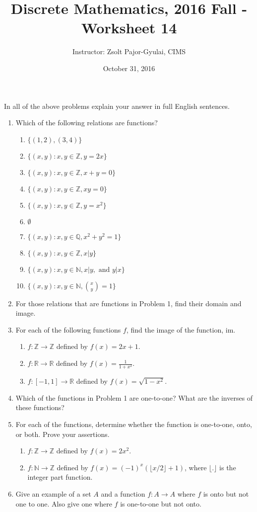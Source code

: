 \documentclass[11pt]{preprint}
\title{Discrete Mathematics, 2016 Fall - Worksheet 14}
\author{Instructor: Zsolt Pajor-Gyulai, CIMS}
\date{October 31, 2016}
\def\enumb{\begin{enumerate}}
\def\enume{\end{enumerate}}
\begin{document}
\maketitle

In all of the above problems explain your answer in full English sentences.

\enumb
\item Which of the following relations are functions?
\enumb
\item $\{(1,2),(3,4)\}$
\item $\{(x,y): x,y\in\mathbb{Z}, y=2x\}$
\item $\{(x,y): x,y\in\mathbb{Z}, x+y=0\}$
\item $\{(x,y): x,y\in\mathbb{Z}, xy=0\}$
\item $\{(x,y): x,y\in\mathbb{Z}, y=x^2\}$
\item $\emptyset$
\item $\{(x,y): x,y\in\mathbb{Q}, x^2+y^2=1\}$
\item $\{(x,y): x,y\in\mathbb{Z}, x|y\}$
\item $\{(x,y): x,y\in\mathbb{N}, x|y,\textrm{ and }y|x\}$
\item $\{(x,y): x,y\in\mathbb{N}, \binom{x}{y}=1\}$
\enume

\item For those relations that are functions in Problem 1, find their domain and image.

\item For each of the following functions $f$, find the image of the function, $\textrm{im}$.

\enumb
\item $f:\mathbb{Z}\to\mathbb{Z}$ defined by $f(x)=2x+1$.
\item $f:\mathbb{R}\to\mathbb{R}$ defined by $f(x)=\frac{1}{1+x^2}$.
\item $f:[-1,1]\to\mathbb{R}$ defined by $f(x)=\sqrt{1-x^2}$.
\enume

\item Which of the functions in Problem 1 are one-to-one? What are the inverses of these functions?
\item For each of the functions, determine whether the function is one-to-one, onto, or both. Prove your assertions.
\enumb
\item $f:\mathbb{Z}\to\mathbb{Z}$ defined by $f(x)=2x^2$.
\item $f:\mathbb{N}\to\mathbb{Z}$ defined by $f(x)=(-1)^x \left(\lfloor x/2\rfloor+1\right)$, where $\lfloor.\rfloor$ is the integer part function.
\enume
\item Give an example of a set $A$ and a function $f:A\to A$ where $f$ is onto but not one to one. Also give one where $f$ is one-to-one but not onto. 
\enume
\end{document}
